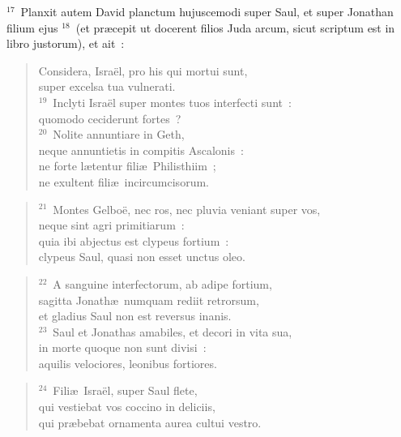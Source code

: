 ${}^{17}$~Planxit autem David planctum hujuscemodi super Saul, et super Jonathan filium ejus
${}^{18}$~(et pr\ae cepit ut docerent filios Juda arcum, sicut scriptum est in libro justorum), et ait~: \begin{flushleft}\begin{verse}Considera, Isra\"el, pro his qui mortui sunt,\\ super excelsa tua vulnerati.\\
${}^{19}$~Inclyti Isra\"el super montes tuos interfecti sunt~:\\ quomodo ceciderunt fortes~?\\
${}^{20}$~Nolite annuntiare in Geth,\\ neque annuntietis in compitis Ascalonis~:\\ ne forte l\ae tentur fili\ae\ Philisthiim~;\\ ne exultent fili\ae\ incircumcisorum.\end{verse}\end{flushleft}


\begin{flushleft}\begin{verse}${}^{21}$~Montes Gelbo\"e, nec ros, nec pluvia veniant super vos,\\ neque sint agri primitiarum~:\\ quia ibi abjectus est clypeus fortium~:\\ clypeus Saul, quasi non esset unctus oleo.\end{verse}\end{flushleft}


\begin{flushleft}\begin{verse}${}^{22}$~A sanguine interfectorum, ab adipe fortium,\\ sagitta Jonath\ae\ numquam rediit retrorsum,\\ et gladius Saul non est reversus inanis.\\
${}^{23}$~Saul et Jonathas amabiles, et decori in vita sua,\\ in morte quoque non sunt divisi~:\\ aquilis velociores, leonibus fortiores.\end{verse}\end{flushleft}


\begin{flushleft}\begin{verse}${}^{24}$~Fili\ae\ Isra\"el, super Saul flete,\\ qui vestiebat vos coccino in deliciis,\\ qui pr\ae bebat ornamenta aurea cultui vestro.\end{verse}\end{flushleft}


